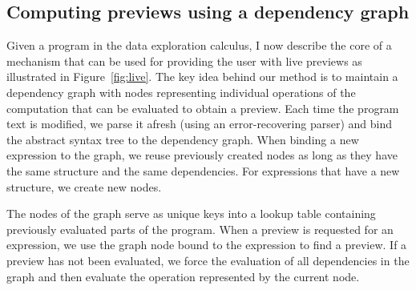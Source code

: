 \documentclass[fleqn,11pt]{report}
\theoremstyle{definition}
\begin{document}
\subsection{Computing previews using a dependency graph}

Given a program in the data exploration calculus, I now describe the core of a mechanism that
can be used for providing the user with live previews as illustrated in Figure~\ref{fig:live}.
The key idea behind our method is to maintain a dependency graph with
nodes representing individual operations of the computation that can be evaluated
to obtain a preview. Each time the program text is modified, we parse it afresh (using an
error-recovering parser) and bind the abstract syntax tree to the dependency graph.
When binding a new expression to the graph, we reuse previously created nodes as long as
they have the same structure and the same dependencies. For expressions that have a new
structure, we create new nodes.

The nodes of the graph serve as unique keys into a lookup table containing previously
evaluated parts of the program. When a preview is requested for an expression, we use the graph
node bound to the expression to find a preview. If a preview has not been evaluated, we force
the evaluation of all dependencies in the graph and then evaluate the operation represented by
the current node.
\end{document}
